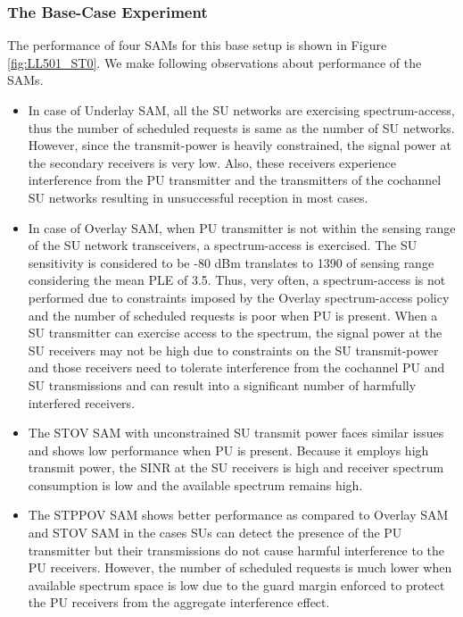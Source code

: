 \documentclass[12pt, draftclsnofoot, onecolumn]{IEEEtran}
\begin{document}
\subsubsection{The Base-Case Experiment}
The performance of four SAMs for this base setup is shown in Figure \ref{fig:LL501_ST0}. We make following observations about  performance of the SAMs.
\begin{itemize}
	\item In case of Underlay SAM, all the SU networks are exercising spectrum-access, thus the number of scheduled requests is same as the number of SU networks. However, since the transmit-power is heavily constrained,  the signal power at the secondary receivers is very low. Also, these receivers experience interference from the PU transmitter and the transmitters of the cochannel SU networks resulting in unsuccessful reception in most cases.
	\item In case of Overlay SAM, when PU transmitter is not within the sensing range of the SU network transceivers, a spectrum-access is exercised. The SU sensitivity is considered to be -80 dBm translates to 1390  of sensing range considering the mean PLE of 3.5. Thus, very often, a spectrum-access is not performed due to constraints imposed by the Overlay spectrum-access policy and the number of scheduled requests is poor when PU is present. When a SU transmitter can exercise access to the spectrum, the signal power at the SU receivers may not be high due to constraints on the SU transmit-power and those receivers need to tolerate interference from the cochannel PU and SU transmissions and can result into a significant number of harmfully interfered receivers.
	\item The STOV SAM with unconstrained SU transmit power faces similar issues and shows low performance when PU is present. Because it employs high transmit power, the SINR at the SU receivers is high and receiver spectrum consumption is low and the available spectrum remains high.
	\item The STPPOV SAM shows better performance as compared to Overlay SAM and STOV SAM in the cases SUs can detect the presence of the PU transmitter but their transmissions do not cause harmful interference to the PU receivers. However, the number of  scheduled requests is much lower when available spectrum space is low due to the guard margin enforced to protect the PU receivers from the aggregate interference effect.
\end{itemize}
\end{document}
